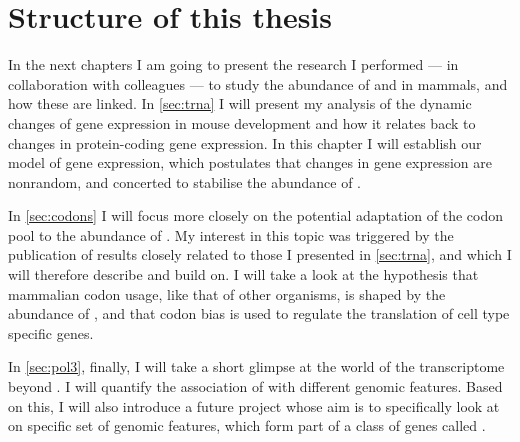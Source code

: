 \section{Structure of this thesis}

In the next chapters I am going to present the research I performed --- in
collaboration with colleagues ---  to study the abundance of \trna and \mrna in
mammals, and how these are linked. In \cref{sec:trna} I will present my analysis
of the dynamic changes of \trna gene expression in mouse development and how it
relates back to changes in protein-coding gene expression. In this chapter I
will establish our model of \trna gene expression, which postulates that changes
in \trna gene expression are nonrandom, and concerted to stabilise the abundance
of \trna[s].

In \cref{sec:codons} I will focus more closely on the potential adaptation of
the codon pool to the abundance of \trna[s]. My interest in this topic was
triggered by the publication of results closely related to those I presented in
\cref{sec:trna}, and which I will therefore describe and build on. I will take a
look at the hypothesis that mammalian codon usage, like that of other organisms,
is shaped by the abundance of \trna[s], and that codon bias is used to regulate
the translation of cell type specific genes.

In \cref{sec:pol3}, finally, I will take a short glimpse at the world of the
 transcriptome beyond \trna[s]. I will quantify the association of 
with different genomic features. Based on this, I will also introduce a future
project whose aim is to specifically look at on specific set of genomic
features, which form part of a class of genes called .

